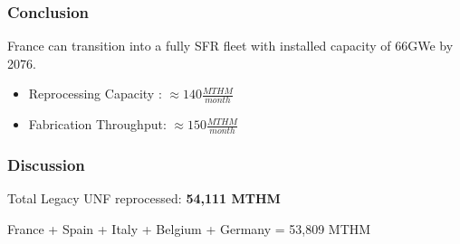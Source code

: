 \begin{frame}
	\frametitle{Conclusion}
	France can transition into
	a fully SFR fleet with installed capacity of 66GWe by 2076.
	\begin{itemize}
		\item Reprocessing Capacity : $\approx 140 \frac{MTHM}{month}$
		\item Fabrication Throughput: $\approx 150 \frac{MTHM}{month}$
	\end{itemize}
\end{frame}

\begin{frame}
    \frametitle{Discussion}
    Total Legacy \gls{UNF} reprocessed: \textbf{54,111 MTHM} 
    
    France + Spain + Italy + Belgium + Germany = 53,809 MTHM
    \begin{table}[h]
\centering
    \begin{adjustbox}{max totalsize={0.7\textwidth}{.8\textheight}, center}
                \begin{tabularx}{\textwidth}{lbb}
                    \hline 
                    

\end{tabularx}
\end{adjustbox}
\end{table}
\end{frame}
